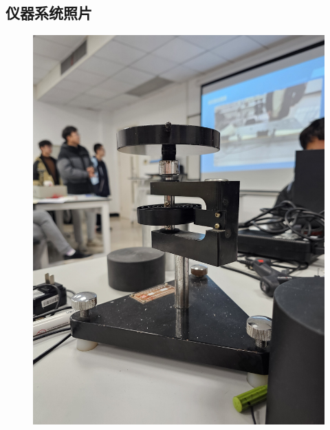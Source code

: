 \documentclass[12pt,hyperref,a4paper,UTF8]{ctexart}
\begin{document}
\subsection{仪器系统照片}

\begin{figure}[H]
    \centering
    \includegraphics[scale=0.1,angle=270]{torsion.jpg}
    \caption{}
\end{figure}
\end{document}
